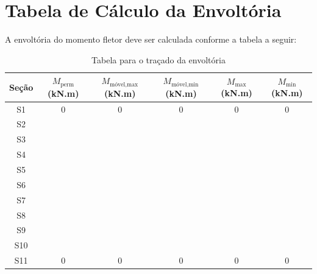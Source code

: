 \section{Tabela de Cálculo da Envoltória}
A envoltória do momento fletor deve ser calculada conforme a tabela a seguir:
\begin{table}[h]
    \centering
    \begin{tabular}{|c|c|c|c|c|c|}
        \toprule \hline
        \textbf{Seção} & $M_{\text{perm}}$ (kN.m) & $M_{\text{móvel,max}}$ (kN.m) & $M_{\text{móvel,min}}$ (kN.m) & $M_{\text{max}}$ (kN.m) & $M_{\text{min}}$ (kN.m) \\
        \midrule  \hline
        S1             & 0                        & 0                             & 0                             & 0                       & 0                       \\ \hline
        S2             &                          &                               &                               &                         &                         \\ \hline
        S3             &                          &                               &                               &                         &                         \\ \hline
        S4             &                          &                               &                               &                         &                         \\ \hline
        S5             &                          &                               &                               &                         &                         \\ \hline
        S6             &                          &                               &                               &                         &                         \\ \hline
        S7             &                          &                               &                               &                         &                         \\ \hline
        S8             &                          &                               &                               &                         &                         \\ \hline
        S9             &                          &                               &                               &                         &                         \\ \hline
        S10            &                          &                               &                               &                         &                         \\ \hline
        S11            & 0                        & 0                             & 0                             & 0                       & 0                       \\  \hline
        \bottomrule
    \end{tabular}
    \caption{Tabela para o traçado da envoltória}
    \label{tab:envoltoria}
\end{table}


